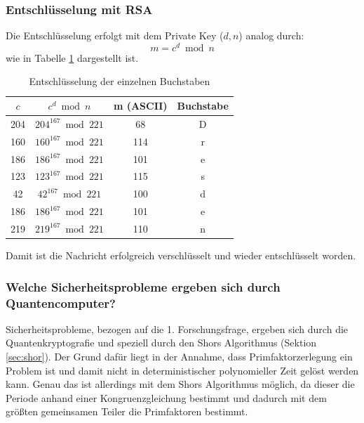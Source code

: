 \subsubsection{Entschlüsselung mit RSA}
Die Entschlüsselung erfolgt mit dem Private Key ($d, n$) analog durch:
\[
m = c^d \bmod n
\]
wie in Tabelle \ref{tab:decryption_dresden} dargestellt ist.
\begin{table}[H]
    \centering
    \begin{tabular}{|c|c|c|c|}
        \hline
        $c$ & $c^d \bmod n$ & m (ASCII) & Buchstabe \\
        \hline
        204 & $204^{167} \bmod 221$ & 68 & D \\
        160 & $160^{167} \bmod 221$ & 114 & r \\
        186 & $186^{167} \bmod 221$ & 101 & e \\
        123 & $123^{167} \bmod 221$ & 115 & s \\
        42 & $42^{167} \bmod 221$ & 100 & d \\
        186 & $186^{167} \bmod 221$ & 101 & e \\
        219 & $219^{167} \bmod 221$ & 110 & n \\
        \hline
    \end{tabular}
    \caption{Entschlüsselung der einzelnen Buchstaben}
    \label{tab:decryption_dresden}
\end{table}
Damit ist die Nachricht  erfolgreich verschlüsselt und wieder entschlüsselt worden.

\subsubsection{Welche Sicherheitsprobleme ergeben sich durch Quantencomputer?}
Sicherheitsprobleme, bezogen auf die 1. Forschungsfrage, ergeben sich durch die
Quantenkryptografie und speziell durch den Shors Algorithmus (Sektion \ref{sec:shor}).
Der Grund dafür liegt in der Annahme, dass Primfaktorzerlegung ein  Problem ist und
damit nicht in deterministischer polynomieller Zeit gelöst werden kann. 
Genau das ist allerdings mit dem Shors Algorithmus möglich, da dieser die Periode anhand
einer Kongruenzgleichung bestimmt und dadurch mit dem größten gemeinsamen 
Teiler die Primfaktoren bestimmt.

